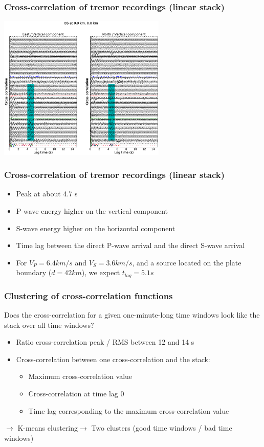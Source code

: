 \documentclass{beamer}
\begin{document}
	\begin{frame}
		\frametitle{Cross-correlation of tremor recordings (linear stack)}
		\begin{center}
			\includegraphics[width=8cm, trim={5cm 2cm 5cm 3.5cm}, clip]{BS/BS_000_000_lin.eps}
		\end{center}
	\end{frame}

	\begin{frame}
		\frametitle{Cross-correlation of tremor recordings (linear stack)}
		\begin{itemize}
			\item Peak at about 4.7 s
			\item P-wave energy higher on the vertical component
			\item S-wave energy higher on the horizontal component
			\item Time lag between the direct P-wave arrival and the direct S-wave arrival
			\item For $V_P = 6.4 km/s$ and $V_S = 3.6 km/s$, and a source located on the plate boundary ($d = 42 km$), we expect $t_{lag} = 5.1 s$
		\end{itemize}
	\end{frame}
		
	\begin{frame}
		\frametitle{Clustering of cross-correlation functions} 
		Does the cross-correlation for a given one-minute-long time windows look like the stack over all time windows?

		\begin{itemize}
			\item Ratio cross-correlation peak / RMS between 12 and 14 s
			\item Cross-correlation between one cross-correlation and the stack:
			\begin{itemize}
				\item Maximum cross-correlation value
				\item Cross-correlation at time lag 0
				\item Time lag corresponding to the maximum cross-correlation value
			\end{itemize}
		\end{itemize}

		$\rightarrow$ K-means clustering$\rightarrow$ Two clusters (good time windows / bad time windows)
	\end{frame}
\end{document}
